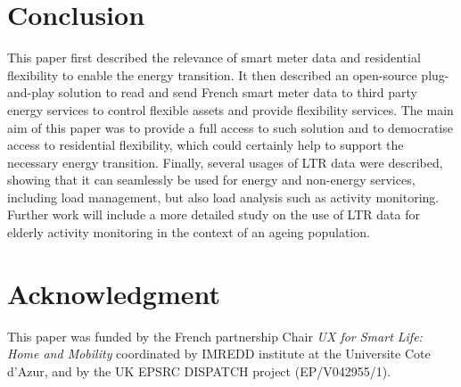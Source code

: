 \documentclass[conference]{IEEEtran}
\begin{document}
\section{Conclusion}
This paper first described the relevance of smart meter data and residential flexibility to enable the energy transition. It then described an open-source plug-and-play solution to read and send French smart meter data to third party energy services to control flexible assets and provide flexibility services. The main aim of this paper was to provide a full access to such solution and to democratise access to residential flexibility, which could certainly help to support the necessary energy transition. Finally, several usages of LTR data were described, showing that it can seamlessly be used for energy and non-energy services, including load management, but also load analysis such as activity monitoring. Further work will include a more  detailed study on the use of LTR data for elderly activity monitoring in the context of an ageing population. 

\section*{Acknowledgment}
This paper was funded by the French partnership Chair \textit{UX for Smart Life: Home and Mobility} coordinated by IMREDD institute at the Universite Cote d'Azur, and by the UK EPSRC DISPATCH project (EP/V042955/1).





\ %



%
\end{document}
